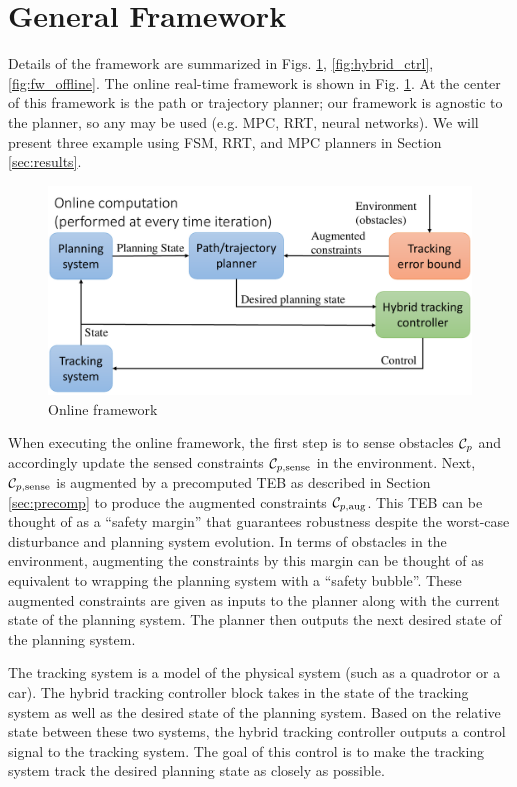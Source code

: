 \section{General Framework \label{sec:framework}}
Details of the framework are summarized in Figs. \ref{fig:fw_online}, \ref{fig:hybrid_ctrl}, \ref{fig:fw_offline}. 
The online real-time framework is shown in Fig. \ref{fig:fw_online}. 
At the center of this framework is the path or trajectory planner; our framework is agnostic to the planner, so any may be used (e.g. MPC, RRT, neural networks). 
We will present three example using FSM, RRT, and MPC planners in Section \ref{sec:results}.
\begin{figure}[h!]
  \centering
	\includegraphics[width=1\columnwidth]{fig/framework_online}
	\caption{Online framework}
	\label{fig:fw_online}
\end{figure}

When executing the online framework, the first step is to sense obstacles $\mathcal C_p$ and accordingly update the sensed constraints $\mathcal C_{p,\text{sense}}$ in the environment.
Next, $\mathcal C_{p,\text{sense}}$ is augmented  by a precomputed TEB as described in Section \ref{sec:precomp} to produce the augmented constraints $\mathcal C_{p,\text{aug}}$. 
This TEB can be thought of as a ``safety margin'' that guarantees robustness despite the worst-case disturbance and planning system evolution. 
In terms of obstacles in the environment, augmenting the constraints by this margin can be thought of as equivalent to wrapping the planning system with a ``safety bubble''. 
These augmented constraints are given as inputs to the planner along with the current state of the planning system. 
The planner then outputs the next desired state of the planning system. 

The tracking system is a model of the physical system (such as a quadrotor or a car). 
The hybrid tracking controller block takes in the state of the tracking system as well as the desired state of the planning system. 
Based on the relative state between these two systems, the hybrid tracking controller outputs a control signal to the tracking system. 
The goal of this control is to make the tracking system track the desired planning state as closely as possible.


